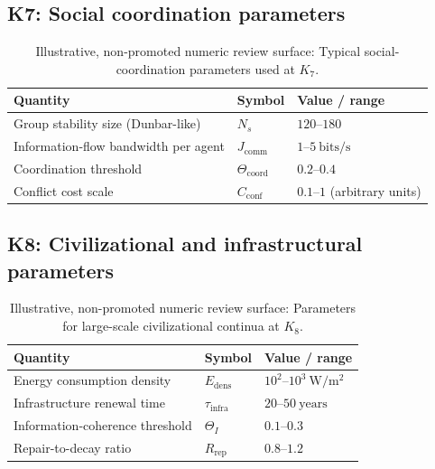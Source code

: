 
\subsection*{K7: Social coordination parameters}

\begin{table}[h]
  \centering
  \caption{Illustrative, non-promoted numeric review surface: Typical social-coordination parameters used at \(K_7\).}
  \label{tab:k7-social-parameters}
  \begin{tabular}{lll}
    \hline
    Quantity & Symbol & Value / range \\
    \hline
    Group stability size (Dunbar-like) & \(N_s\)
        & \(120\text{–}180\) \\
    Information-flow bandwidth per agent & \(J_\mathrm{comm}\)
        & \(1\text{–}5~\mathrm{bits/s}\) \\
    Coordination threshold & \(\Theta_{\mathrm{coord}}\)
        & \(0.2\text{–}0.4\) \\
    Conflict cost scale & \(C_\mathrm{conf}\)
        & \(0.1\text{–}1\) (arbitrary units) \\
    \hline
  \end{tabular}
\end{table}


\subsection*{K8: Civilizational and infrastructural parameters}

\begin{table}[h]
  \centering
  \caption{Illustrative, non-promoted numeric review surface: Parameters for large-scale civilizational continua at \(K_8\).}
  \label{tab:k8-civilizational-parameters}
  \begin{tabular}{lll}
    \hline
    Quantity & Symbol & Value / range \\
    \hline
    Energy consumption density & \(E_\mathrm{dens}\)
        & \(10^2\text{–}10^3~\mathrm{W/m^2}\) \\
    Infrastructure renewal time & \(\tau_\mathrm{infra}\)
        & \(20\text{–}50~\mathrm{years}\) \\
    Information-coherence threshold & \(\Theta_I\)
        & \(0.1\text{–}0.3\) \\
    Repair-to-decay ratio & \(R_\mathrm{rep}\)
        & \(0.8\text{–}1.2\) \\
    \hline
  \end{tabular}
\end{table}

